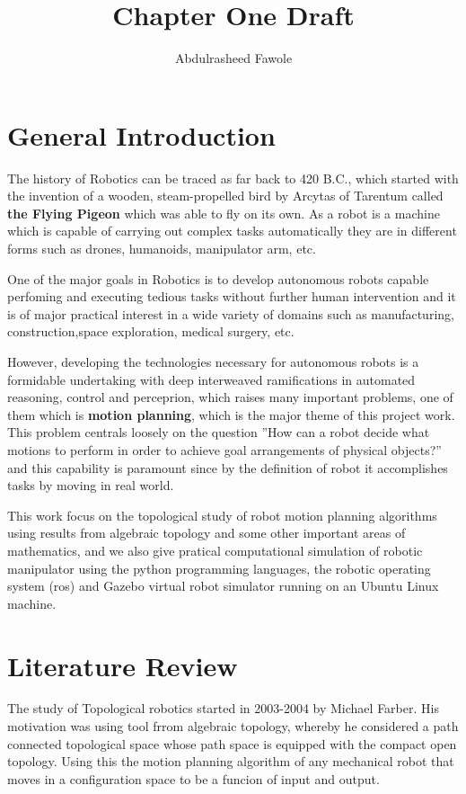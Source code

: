 \documentclass[a4paper, 12pt]{scrartcl}
\title{Chapter One Draft}
\author{Abdulrasheed Fawole}
\theoremstyle{definition}
\begin{document}
\baselineskip24pt
    \maketitle
    \section{General Introduction}
    The history of Robotics can be traced as far back to 420 B.C., which started with the invention of a wooden, steam-propelled bird by Arcytas of Tarentum called \textbf{the Flying Pigeon} which was able to fly on its own.
    As a robot is a machine which is capable of carrying out complex tasks automatically they are in different forms such as drones, humanoids, manipulator arm, etc.

    One of the major goals in Robotics is to develop autonomous robots capable perfoming and executing tedious tasks without further human intervention and it is of major practical interest in a wide variety of domains such as manufacturing, construction,space exploration, medical surgery, etc.

    However, developing the technologies necessary for autonomous robots is a formidable undertaking with deep interweaved ramifications in automated reasoning, control and perceprion, which raises many important problems, one of them which is \textbf{motion planning}, which is the major theme of this project work. This problem centrals loosely on the question ''How can a robot decide what motions to perform in order to achieve goal arrangements of physical objects?'' and this capability is paramount since by the definition of robot it accomplishes tasks by moving in real world.
    
    This work focus on the topological study of robot motion planning algorithms using results from algebraic topology and some other important areas of mathematics, and we also give pratical computational simulation of robotic manipulator using the python programming languages, the robotic operating system (ros) and Gazebo virtual robot simulator running on an Ubuntu Linux machine.
    
    \section{Literature Review}
    The study of Topological robotics started in 2003-2004 by Michael Farber. His motivation was using tool frrom algebraic topology, whereby he considered a path connected topological space whose path space is equipped with the compact open topology. Using this the motion planning algorithm of any mechanical robot that moves in a configuration space to be a funcion of input and output.
\end{document}
